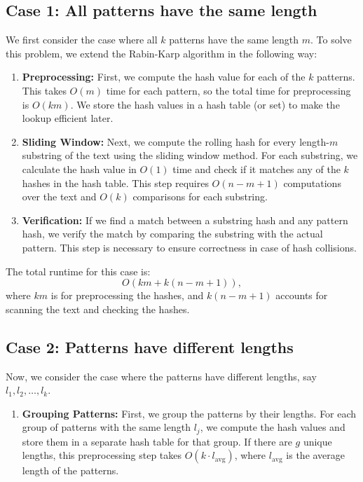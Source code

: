 \documentclass[10pt,letter,notitlepage]{article}
\begin{document}
\begin{Answer}[]
\subsection*{Case 1: All patterns have the same length}

We first consider the case where all \(k\) patterns have the same length \(m\). To solve this problem, we extend the Rabin-Karp algorithm in the following way:

\begin{enumerate}
    \item \textbf{Preprocessing:} First, we compute the hash value for each of the \(k\) patterns. This takes \(O(m)\) time for each pattern, so the total time for preprocessing is \(O(km)\). We store the hash values in a hash table (or set) to make the lookup efficient later.
    
    \item \textbf{Sliding Window:} Next, we compute the rolling hash for every length-\(m\) substring of the text using the sliding window method. For each substring, we calculate the hash value in \(O(1)\) time and check if it matches any of the \(k\) hashes in the hash table. This step requires \(O(n - m + 1)\) computations over the text and \(O(k)\) comparisons for each substring.
    
    \item \textbf{Verification:} If we find a match between a substring hash and any pattern hash, we verify the match by comparing the substring with the actual pattern. This step is necessary to ensure correctness in case of hash collisions.
\end{enumerate}

The total runtime for this case is:
\[
O(km + k(n - m + 1)),
\]
where \(km\) is for preprocessing the hashes, and \(k(n - m + 1)\) accounts for scanning the text and checking the hashes.

\subsection*{Case 2: Patterns have different lengths}

Now, we consider the case where the patterns have different lengths, say \(l_1, l_2, \dots, l_k\).

\begin{enumerate}
    \item \textbf{Grouping Patterns:} First, we group the patterns by their lengths. For each group of patterns with the same length \(l_j\), we compute the hash values and store them in a separate hash table for that group. If there are \(g\) unique lengths, this preprocessing step takes \(O(k \cdot l_{\text{avg}})\), where \(l_{\text{avg}}\) is the average length of the patterns.


\end{enumerate}
\end{Answer}
\end{document}
